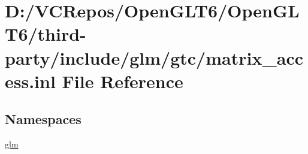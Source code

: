 \hypertarget{matrix__access_8inl}{}\section{D\+:/\+V\+C\+Repos/\+Open\+G\+L\+T6/\+Open\+G\+L\+T6/third-\/party/include/glm/gtc/matrix\+\_\+access.inl File Reference}
\label{matrix__access_8inl}
\subsection*{Namespaces}
\begin{DoxyCompactItemize}
\item 
 \mbox{\hyperlink{namespaceglm}{glm}}
\end{DoxyCompactItemize}
